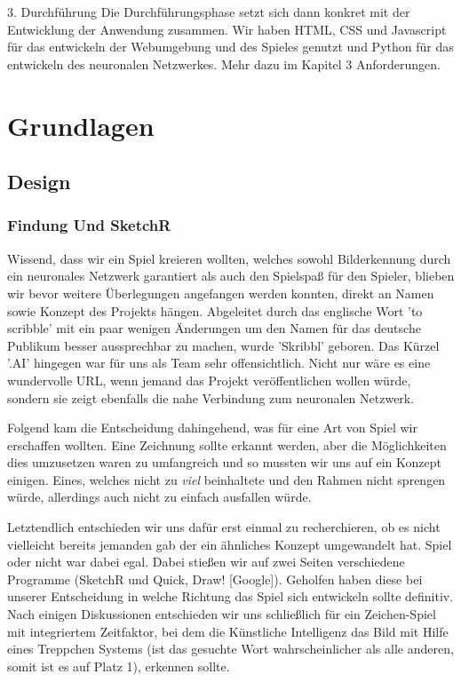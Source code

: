\documentclass[11pt]{article}
\begin{document}
3. Durchführung
	Die Durchführungsphase setzt sich dann konkret mit der 					Entwicklung der Anwendung zusammen.
	Wir haben HTML, CSS und Javascript für das entwickeln der 			Webumgebung und des Spieles genutzt und Python für das 				entwickeln des neuronalen Netzwerkes.
	Mehr dazu im Kapitel 3 Anforderungen.

\section{Grundlagen}
\subsection{Design}
\subsubsection{Findung Und SketchR}

Wissend, dass wir ein Spiel kreieren wollten, welches sowohl Bilderkennung durch ein neuronales Netzwerk garantiert als auch den Spielspaß für den Spieler, blieben wir bevor weitere Überlegungen angefangen werden konnten, direkt an Namen sowie Konzept des Projekts hängen. 
Abgeleitet durch das englische Wort 'to scribble' mit ein paar wenigen Änderungen um den Namen für das deutsche Publikum besser aussprechbar zu machen, wurde 'Skribbl' geboren. Das Kürzel '.AI' hingegen war für uns als Team sehr offensichtlich. Nicht nur wäre es eine wundervolle URL, wenn jemand das Projekt veröffentlichen wollen würde, sondern sie zeigt ebenfalls die nahe Verbindung zum neuronalen Netzwerk.

Folgend kam die Entscheidung dahingehend, was für eine Art von Spiel wir erschaffen wollten. Eine Zeichnung sollte erkannt werden, aber die Möglichkeiten dies umzusetzen waren zu umfangreich und so mussten wir uns auf ein Konzept einigen. Eines, welches nicht zu \textit{viel} beinhaltete und den Rahmen nicht sprengen würde, allerdings auch nicht zu einfach ausfallen würde. 

Letztendlich entschieden wir uns dafür erst einmal zu recherchieren, ob es nicht vielleicht bereits jemanden gab der ein ähnliches Konzept umgewandelt hat. Spiel oder nicht war dabei egal. 
Dabei stießen wir auf zwei Seiten verschiedene Programme (SketchR und Quick, Draw! [Google]). Geholfen haben diese bei unserer Entscheidung in welche Richtung das Spiel sich entwickeln sollte definitiv. Nach einigen Diskussionen entschieden wir uns schließlich für ein Zeichen-Spiel mit integriertem Zeitfaktor, bei dem die Künstliche Intelligenz das Bild mit Hilfe eines Treppchen Systems (ist das gesuchte Wort wahrscheinlicher als alle anderen, somit ist es auf Platz 1), erkennen sollte. 
\end{document}
